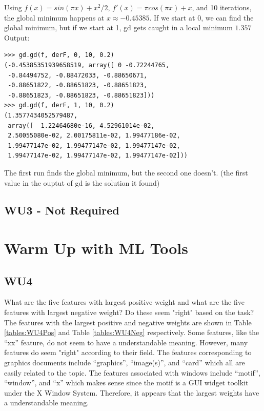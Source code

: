 \documentclass[a4paper,11pt]{article}
\begin{document}
Using $f(x) = sin(\pi x) + x^2/2$, $f'(x) = \pi cos(\pi x) + x$, and
10 iterations, the
global minimum happens at $x\approx -0.45385$.
If we start at 0, we can find the global minimum, but if we start at
1, gd gets caught in a local minimum $1.357$
Output:
\begin{verbatim}
>>> gd.gd(f, derF, 0, 10, 0.2)
(-0.45385351939658519, array([ 0 -0.72244765, 
 -0.84494752, -0.88472033, -0.88650671, 
 -0.88651822, -0.88651823, -0.88651823, 
 -0.88651823, -0.88651823, -0.88651823]))
>>> gd.gd(f, derF, 1, 10, 0.2)
(1.3577434052579487, 
 array([  1.22464680e-16, 4.52961014e-02,
 2.50055080e-02, 2.00175811e-02, 1.99477186e-02, 
 1.99477147e-02, 1.99477147e-02, 1.99477147e-02, 
 1.99477147e-02, 1.99477147e-02, 1.99477147e-02]))
\end{verbatim}

The first run finds the global minimum, but the second one
doesn't. (the first value in the ouptut of gd is the solution it found)

\subsection{WU3 - Not Required}

\newpage

\section{Warm Up with ML Tools}
\label{sec:warmup}
\subsection{WU4}
\textsf{What are the five features with largest positive weight and what
are the five features with largest negative weight? Do these seem "right"
based on the task?}\\

The features with the largest positive and negative weights are shown in 
Table \ref{tables:WU4Pos} and Table \ref{tables:WU4Neg} respectively. 
Some features, like the ``xx'' feature, do not seem to have a understandable 
meaning. However, many features do seem "right" according to their field.
The features corresponding to graphics documents include ``graphics'', 
``image(s)'', and ``card'' which all are easily related to the topic. 
The features associated with windows include ``motif'', ``window'', and ``x''
which makes sense since the motif is a GUI widget toolkit under the X Window System. 
Therefore, it appears that the largest weights have a understandable meaning.
\end{document}
